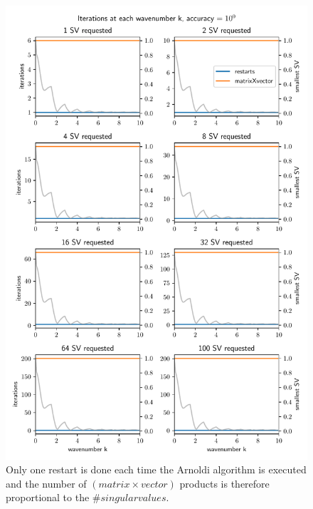\documentclass[a4paper, oneside]{discothesis}
\begin{document}
\begin{figure} [H]
	\centering
	\includegraphics[width=\columnwidth]{figures/arnoldi_iter_1e2.pdf}
	\caption{
		Only one restart is done each time the Arnoldi algorithm is executed and the number of $(matrix\times vector)$ products is therefore proportional to the $\#singularvalues$.
	}
	\label{fig:arnoldi_iter_1e2}
\end{figure}
\end{document}
